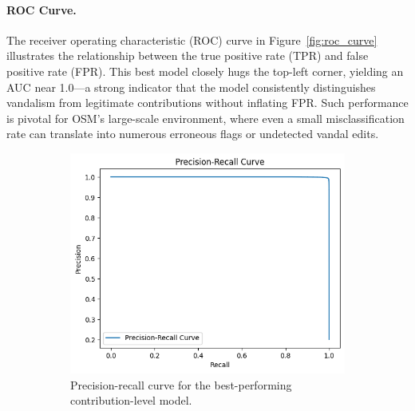 \documentclass[
    13pt, %
    a4paper, %
    listof=totoc, %
    bibliography=totoc, %
    index=totoc, %
    headsepline
]{scrreprt}
\begin{document}
\paragraph{ROC Curve.}
The receiver operating characteristic (ROC) curve in Figure~\ref{fig:roc_curve} illustrates the relationship between the true positive rate (TPR) and false positive rate (FPR). This best model closely hugs the top-left corner, yielding an AUC near 1.0—a strong indicator that the model consistently distinguishes vandalism from legitimate contributions without inflating FPR. Such performance is pivotal for OSM’s large-scale environment, where even a small misclassification rate can translate into numerous erroneous flags or undetected vandal edits.

\begin{figure}[H]
    \centering
    \begin{subfigure}[t]{0.48\textwidth} %
        \centering
        \includegraphics[width=\textwidth]{precision_recall_curve.png}
        \caption{Precision-recall curve for the best-performing contribution-level model.}
        \label{fig:precision_recall}
    \end{subfigure}
    \hfill %
    \begin{subfigure}[t]{0.48\textwidth}
        \centering

\end{subfigure}
\end{figure}
\end{document}
